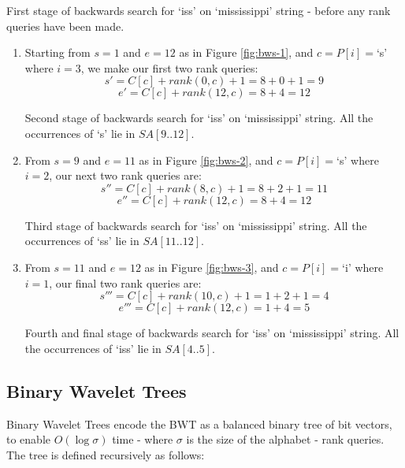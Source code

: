 \clearpage			
			{First stage of backwards search for `iss' on `mississippi'
			 string - before any rank queries have been made.}

\begin{enumerate}
	\item
		Starting from $s = 1$ and $e = 12$ as in Figure \ref{fig:bws-1},
		and $c = P[i] = $`s' where $i = 3$, we make our first two rank queries:
			$$s' = C[c] + rank(0, c) + 1 = 8 + 0 + 1 = 9$$
			$$e' = C[c] + rank(12, c) = 8 + 4 = 12$$
		
				{Second stage of backwards search for `iss' on `mississippi'
				string. All the occurrences of `s' lie in $SA[9..12]$.}
\clearpage				
	\item
		From $s = 9$ and $e = 11$ as in Figure \ref{fig:bws-2},
		and $c = P[i] = $`s' where $i = 2$, our next two rank queries are:
			$$s'' = C[c] + rank(8, c) + 1 = 8 + 2 + 1 = 11$$
			$$e'' = C[c] + rank(12, c) = 8 + 4 = 12$$
	
			
				{Third stage of backwards search for `iss' on `mississippi'
				string. All the occurrences of `ss' lie in $SA[11..12]$.}
	
	\item
		From $s = 11$ and $e = 12$ as in Figure \ref{fig:bws-3},
		and $c = P[i] = $`i' where $i = 1$, our final two rank queries are:
			$$s''' = C[c] + rank(10, c) + 1 = 1 + 2 + 1 = 4$$
			$$e''' = C[c] + rank(12, c) = 1 + 4 = 5$$
			
			
				{Fourth and final stage of backwards search for `iss' on
				`mississippi' string. All the occurrences of `iss' lie in
				$SA[4..5]$.}
				
\end{enumerate}

\clearpage
\subsection{Binary Wavelet Trees}

Binary Wavelet Trees encode the BWT as a balanced binary tree of bit vectors, to 
enable $O(\log \sigma)$ time - where $\sigma$ is the size of the alphabet - rank 
queries. The tree is defined recursively as follows:

